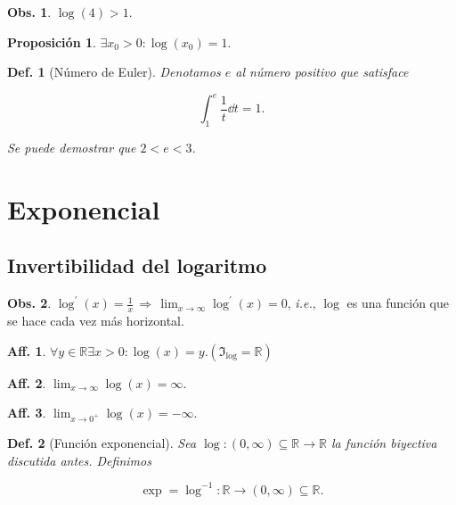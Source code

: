\documentclass{article}
\theoremstyle{definicion}
\newtheorem{definicion}{Def.}
\theoremstyle{definition}             %
\theoremstyle{definition}             %
\theoremstyle{definition}
\theoremstyle{definition}
\theoremstyle{observacion}
\newtheorem{obs}{Obs.}
\theoremstyle{definition}
\newtheorem{prop}{Proposición}
\theoremstyle{plain}
\theoremstyle{definition}
\theoremstyle{afirmacion}
\newtheorem{aff}{Aff.}
\theoremstyle{definition}
\begin{document}
    \begin{obs}
        \(\log(4) > 1.\)
    \end{obs}

    \begin{prop}
        \(\exists x_{0} > 0 \colon \log(x_{0}) = 1.\)
    \end{prop}

    \begin{definicion}[Número de Euler] 
        Denotamos \(e\) al número positivo que satisface 

        \begin{equation*}
            \int_{1}^{e} \dfrac{1}{t}\dd{t} = 1.
        \end{equation*}

        Se puede demostrar que \(2 < e < 3\).
    \end{definicion}

    \section{Exponencial}
    \subsection{Invertibilidad del logaritmo}

    \begin{obs}
        \(\log^{\prime}(x) = \frac{1}{x}\, \Rightarrow\, \lim_{x\to\infty}\log^{\prime}(x) = 0\), \emph{i.e.}, \(\log\) es una función que se hace cada vez más horizontal.
    \end{obs}

    \begin{aff}
        \(\forall y \in \mathbb{R} \exists x > 0 \colon  \log(x) = y. (\Im_{\log} = \mathbb{R})\)
    \end{aff}

    \begin{aff}
        \(\lim_{x\to\infty} \log(x) = \infty.\)
    \end{aff}

    \begin{aff}
        \(\lim_{x \to 0^{+}}\log(x) = -\infty.\)
    \end{aff}

    \begin{definicion}[Función exponencial]
        Sea \(\log \colon (0, \infty) \subseteq \mathbb{R} \to \mathbb{R}\) la función biyectiva discutida antes. Definimos 

        \begin{equation*}
            \exp = \log^{-1} \colon \mathbb{R} \to (0,\infty) \subseteq \mathbb{R}.
        \end{equation*}
    \end{definicion}
\end{document}
